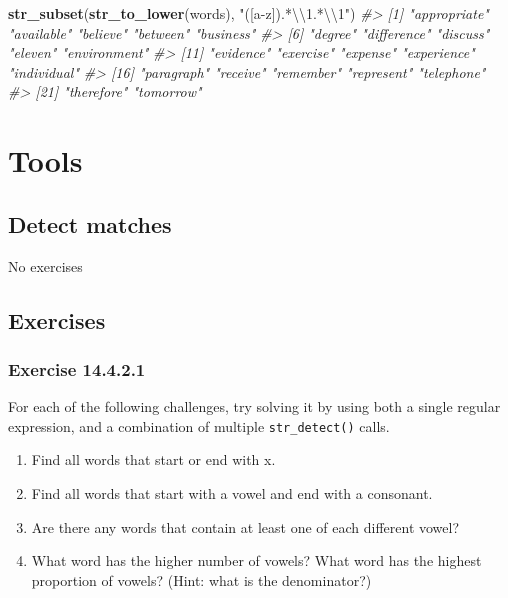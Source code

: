 \documentclass[]{book}
\newenvironment{Shaded}{\begin{snugshade}}{\end{snugshade}}
\newcommand{\CharTok}[1]{\textcolor[rgb]{0.31,0.60,0.02}{#1}}
\newcommand{\CommentTok}[1]{\textcolor[rgb]{0.56,0.35,0.01}{\textit{#1}}}
\newcommand{\KeywordTok}[1]{\textcolor[rgb]{0.13,0.29,0.53}{\textbf{#1}}}
\newcommand{\NormalTok}[1]{#1}
\newcommand{\StringTok}[1]{\textcolor[rgb]{0.31,0.60,0.02}{#1}}
\providecommand{\tightlist}{%
  \setlength{\itemsep}{0pt}\setlength{\parskip}{0pt}}
\theoremstyle{plain}
\theoremstyle{remark}
\begin{document}
\begin{enumerate}
\begin{Shaded}
\begin{Highlighting}[]
\KeywordTok{str_subset}\NormalTok{(}\KeywordTok{str_to_lower}\NormalTok{(words), }\StringTok{"([a-z]).*}\CharTok{\textbackslash{}\textbackslash{}}\StringTok{1.*}\CharTok{\textbackslash{}\textbackslash{}}\StringTok{1"}\NormalTok{)}
\CommentTok{#>  [1] "appropriate" "available"   "believe"     "between"     "business"   }
\CommentTok{#>  [6] "degree"      "difference"  "discuss"     "eleven"      "environment"}
\CommentTok{#> [11] "evidence"    "exercise"    "expense"     "experience"  "individual" }
\CommentTok{#> [16] "paragraph"   "receive"     "remember"    "represent"   "telephone"  }
\CommentTok{#> [21] "therefore"   "tomorrow"}
\end{Highlighting}
\end{Shaded}
\end{enumerate}

\hypertarget{tools}{%
\section{Tools}\label{tools}}

\hypertarget{detect-matches}{%
\subsection{Detect matches}\label{detect-matches}}

No exercises

\hypertarget{exercises-1}{%
\subsection{Exercises}\label{exercises-1}}

\hypertarget{exercise-14.4.2.1}{%
\subsubsection*{\texorpdfstring{Exercise
{14.4.2.1}}{Exercise 14.4.2.1}}\label{exercise-14.4.2.1}}

For each of the following challenges, try solving it by using both a
single regular expression, and a combination of multiple
\texttt{str\_detect()} calls.

\begin{enumerate}
\def\labelenumi{\arabic{enumi}.}
\tightlist
\item
  Find all words that start or end with x.
\item
  Find all words that start with a vowel and end with a consonant.
\item
  Are there any words that contain at least one of each different vowel?
\item
  What word has the higher number of vowels? What word has the highest
  proportion of vowels? (Hint: what is the denominator?)
\end{enumerate}
\end{document}
